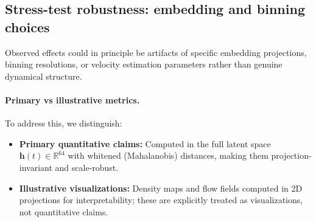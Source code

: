 \documentclass[5p,twocolumn,authoryear]{elsarticle}
\begin{document}
%

\subsection{Stress-test robustness: embedding and binning choices}
\label{app:stress_test}

Observed effects could in principle be artifacts of specific embedding projections, binning resolutions, or velocity estimation parameters rather than genuine dynamical structure.

\paragraph{Primary vs illustrative metrics.}
To address this, we distinguish:
\begin{itemize}
    \item \textbf{Primary quantitative claims:} Computed in the full latent space $\mathbf{h}(t) \in \mathbb{R}^{64}$ with whitened (Mahalanobis) distances, making them projection-invariant and scale-robust.
    \item \textbf{Illustrative visualizations:} Density maps and flow fields computed in 2D projections for interpretability; these are explicitly treated as visualizations, not quantitative claims.
\end{itemize}
\end{document}
